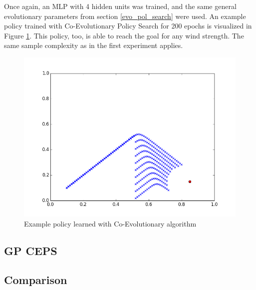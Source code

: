 Once again, an MLP with 4 hidden units was trained, and the same general evolutionary parameters from section \ref{evo_pol_search} were used. An example policy trained with Co-Evolutionary Policy Search for 200 epochs is visualized in Figure \ref{Example policy learned with Co-Evolutionary algorithm}. This policy, too, is able to reach the goal for any wind strength. The same sample complexity as in the first experiment applies.


\begin{figure}[ht]
  \centering
  \includegraphics[scale=0.5]{images/co_evo_result.png}
  \caption{Example policy learned with Co-Evolutionary algorithm}\label{Example policy learned with Co-Evolutionary algorithm}
\end{figure}

\subsection{GP CEPS}

\subsection{Comparison}

